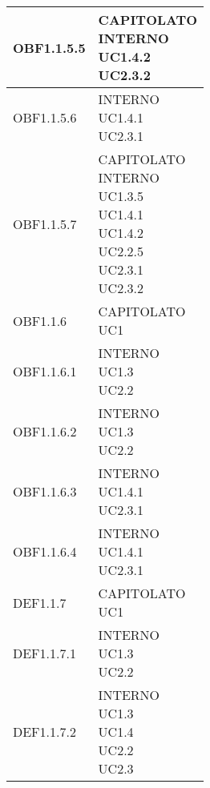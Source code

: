 \documentclass{scalatekids-article}
\begin{document}
\begin{longtable}[H]{|p{5.5cm}|p{5.5cm}|}
  \hline
  OBF1.1.5.5 & \multiLineCell[t]{CAPITOLATO\\INTERNO\\UC1.4.2\\UC2.3.2\\}\\
  \hline
  OBF1.1.5.6 & \multiLineCell[t]{INTERNO\\UC1.4.1\\UC2.3.1\\}\\
  \hline
  OBF1.1.5.7 & \multiLineCell[t]{CAPITOLATO\\INTERNO\\UC1.3.5\\UC1.4.1\\UC1.4.2\\UC2.2.5\\UC2.3.1\\UC2.3.2\\}\\
  \hline
  OBF1.1.6 & \multiLineCell[t]{CAPITOLATO\\UC1\\}\\
  \hline
  OBF1.1.6.1 & \multiLineCell[t]{INTERNO\\UC1.3\\UC2.2\\}\\
  \hline
  OBF1.1.6.2 & \multiLineCell[t]{INTERNO\\UC1.3\\UC2.2\\}\\
  \hline
  OBF1.1.6.3 & \multiLineCell[t]{INTERNO\\UC1.4.1\\UC2.3.1\\}\\
  \hline
  OBF1.1.6.4 & \multiLineCell[t]{INTERNO\\UC1.4.1\\UC2.3.1\\}\\
  \hline
  DEF1.1.7 & \multiLineCell[t]{CAPITOLATO\\UC1\\}\\
  \hline
  DEF1.1.7.1 & \multiLineCell[t]{INTERNO\\UC1.3\\UC2.2\\}\\
  \hline
  DEF1.1.7.2 & \multiLineCell[t]{INTERNO\\UC1.3\\UC1.4\\UC2.2\\UC2.3\\}\\

\end{longtable}
\end{document}

